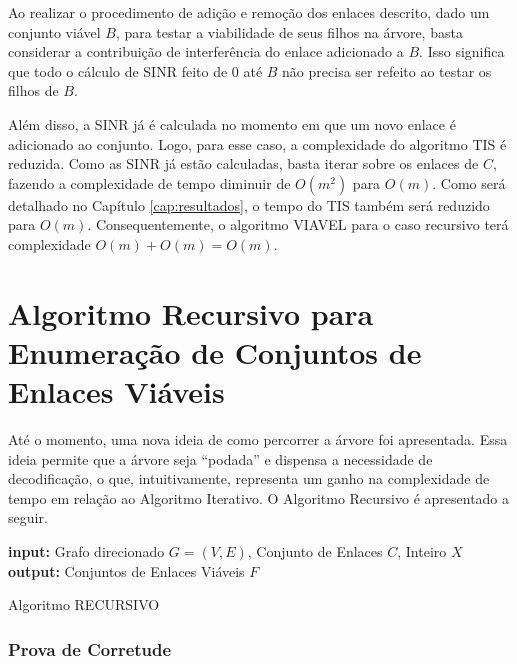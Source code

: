 Ao realizar o procedimento de adição e remoção dos enlaces descrito, dado um conjunto viável $B$, para testar a viabilidade de seus filhos na árvore, basta considerar a contribuição de interferência do enlace adicionado a $B$. Isso significa que todo o cálculo de SINR feito de 0 até $B$ não precisa ser refeito ao testar os filhos de $B$.

Além disso, a SINR já é calculada no momento em que um novo enlace é adicionado ao conjunto. Logo, para esse caso, a complexidade do algoritmo TIS é reduzida. Como as SINR já estão calculadas, basta iterar sobre os enlaces de $C$, fazendo a complexidade de tempo diminuir de $O(m^2)$ para $O(m)$. Como será detalhado no Capítulo \ref{cap:resultados}, o tempo do TIS também será reduzido para $O(m)$. Consequentemente, o algoritmo VIAVEL para o caso recursivo terá complexidade $O(m) + O(m) = O(m)$. 

\section{Algoritmo Recursivo para Enumeração de Conjuntos de Enlaces Viáveis}

Até o momento, uma nova ideia de como percorrer a árvore foi apresentada. Essa ideia permite que a árvore seja “podada” e dispensa a necessidade de decodificação, o que, intuitivamente, representa um ganho na complexidade de tempo em relação ao Algoritmo Iterativo. O Algoritmo Recursivo é apresentado a seguir.

\begin{algorithm}[h]
	\SetVline
	{\bf input:} Grafo direcionado $G=(V,E)$, Conjunto de Enlaces $C$, Inteiro $X$\\
	{\bf output:} Conjuntos de Enlaces Viáveis $F$\\
\caption{Algoritmo RECURSIVO}
\label{alg:recursivo}
\end{algorithm}

\subsubsection{Prova de Corretude}

